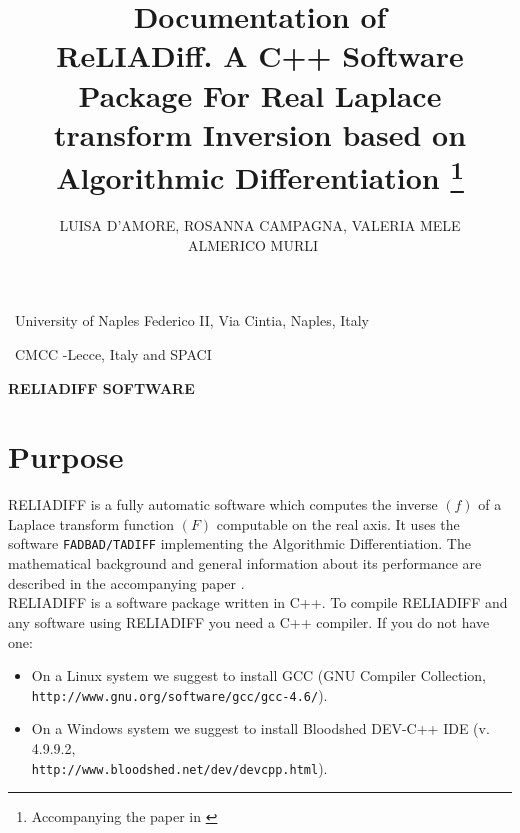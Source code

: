 \documentclass[10pt]{article}
\title{Documentation of  \\ReLIADiff. A C++ Software Package For Real Laplace
transform Inversion based on Algorithmic Differentiation
\footnote{Accompanying the paper in \cite{RELART}} }
\date{}
\begin{document}
\maketitle
\thispagestyle{empty}

\author{
\begin{center} LUISA D'AMORE\dag , ROSANNA CAMPAGNA\dag, VALERIA MELE\dag \\ ALMERICO MURLI\ddag \,  \

\end{center}}

{\dag\ University of Naples Federico II, Via Cintia,  Naples, Italy}


{\ddag\ CMCC -Lecce, Italy and SPACI}


\vspace{2cm}
\begin{center}
 {\large {\bf RELIADIFF SOFTWARE }}
\end{center}
\vspace{2cm}

\setlength{\parindent}{0in}
\newpage
\setcounter{page}{1}
\tableofcontents

\newpage

\section{Purpose} \label{sec:1}

RELIADIFF is a fully automatic software which computes the inverse $(f)$ of a Laplace transform function $(F)$ computable on the real axis.
It uses the software {\tt FADBAD/TADIFF} \cite{2} implementing the Algorithmic Differentiation. The mathematical background and general information about its performance are described in the accompanying paper \cite{RELART}.\\

RELIADIFF is a software package written in C++. To compile RELIADIFF and any software using RELIADIFF you need a C++ compiler.
If you do not have one:
\begin{itemize}
\item
On a Linux system we suggest to install GCC (GNU Compiler Collection,\\ {\tt http://www.gnu.org/software/gcc/gcc-4.6/}).
\item On a Windows system we suggest to install Bloodshed DEV-C++ IDE (v. 4.9.9.2,\\ {\tt http://www.bloodshed.net/dev/devcpp.html}).
\end{itemize}
\end{document}

